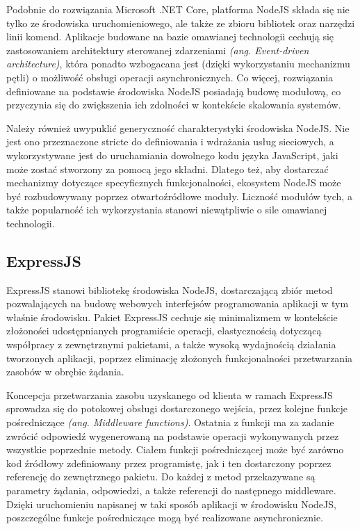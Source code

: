 Podobnie do rozwiązania Microsoft .NET Core, platforma NodeJS składa się nie tylko ze środowiska uruchomieniowego, ale także ze zbioru bibliotek oraz narzędzi linii komend. Aplikacje budowane na bazie omawianej technologii cechują się zastosowaniem architektury sterowanej zdarzeniami \textit{(ang. Event-driven architecture)}, która ponadto wzbogacana jest (dzięki wykorzystaniu mechanizmu pętli) o możliwość obsługi operacji asynchronicznych. Co więcej, rozwiązania definiowane na podstawie środowiska NodeJS posiadają budowę modułową, co przyczynia się do zwiększenia ich zdolności w kontekście skalowania systemów.

Należy również uwypuklić generyczność charakterystyki środowiska NodeJS. Nie jest ono przeznaczone stricte do definiowania i wdrażania usług sieciowych, a wykorzystywane jest do uruchamiania dowolnego kodu języka JavaScript, jaki może zostać stworzony za pomocą jego składni. Dlatego też, aby dostarczać mechanizmy dotyczące specyficznych funkcjonalności, ekosystem NodeJS może być rozbudowywany poprzez otwartoźródłowe moduły. Liczność modułów tych, a także popularność ich wykorzystania stanowi niewątpliwie o sile omawianej technologii.
\subsection*{ExpressJS}
ExpressJS stanowi bibliotekę środowiska NodeJS, dostarczającą zbiór metod pozwalających na budowę webowych interfejsów programowania aplikacji w tym właśnie środowisku. Pakiet ExpressJS cechuje się minimalizmem w kontekście złożoności udostępnianych programiście operacji, elastycznością dotyczącą współpracy z zewnętrznymi pakietami, a także wysoką wydajnością działania tworzonych aplikacji, poprzez eliminację złożonych funkcjonalności przetwarzania zasobów w obrębie żądania.

Koncepcja przetwarzania zasobu uzyskanego od klienta w ramach ExpressJS sprowadza się do potokowej obsługi dostarczonego wejścia, przez kolejne funkcje pośredniczące \textit{(ang. Middleware functions)}. Ostatnia z funkcji ma za zadanie zwrócić odpowiedź wygenerowaną na podstawie operacji wykonywanych przez wszystkie poprzednie metody. Ciałem funkcji pośredniczącej może być zarówno kod źródłowy zdefiniowany przez programistę, jak i ten dostarczony poprzez referencję do zewnętrznego pakietu. Do każdej z metod przekazywane są parametry żądania, odpowiedzi, a także referencji do następnego middleware. Dzięki uruchomieniu napisanej w taki sposób aplikacji w środowisku NodeJS, poszczególne funkcje pośredniczące mogą być realizowane asynchronicznie.
